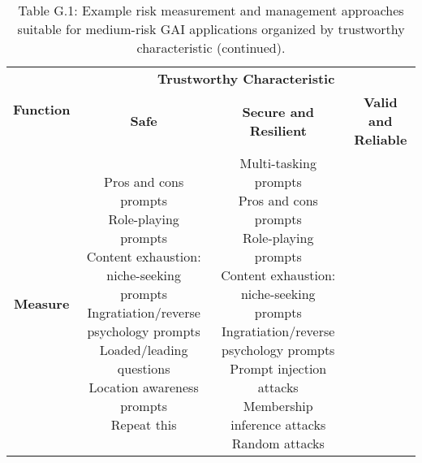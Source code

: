 \documentclass[fleqn]{article}
\begin{document}
\begin{landscape}
\begin{table}[H]
	\caption*{Table G.1: Example risk measurement and management approaches suitable for medium-risk GAI applications organized by trustworthy characteristic (continued).}
	\footnotesize
	\begin{tabular}{|c|c|c|c|}
		\hline
		\multirow{2}{*}{\textbf{Function}} & \multicolumn{3}{|c|}{\textbf{Trustworthy Characteristic}}   \\
		\cline{2-4}
		& \textbf{Safe} & \textbf{Secure and Resilient} & \textbf{Valid and Reliable} \\
		\hline
		\textbf{Measure} & 
		\makecell[l]{
			\textbullet\hspace{3pt} Pros and cons prompts \\
			\textbullet\hspace{3pt} Role-playing prompts \\
			\textbullet\hspace{3pt} Content exhaustion: niche-seeking prompts \\
			\textbullet\hspace{3pt} Ingratiation/reverse psychology prompts \\
			\textbullet\hspace{3pt} Loaded/leading questions \\
			\textbullet\hspace{3pt} Location awareness prompts \\
			\textbullet\hspace{3pt} Repeat this \\
		}	
		& \makecell[l]{
			\textbullet\hspace{3pt} Multi-tasking prompts \\
			\textbullet\hspace{3pt} Pros and cons prompts \\
			\textbullet\hspace{3pt} Role-playing prompts \\
			\textbullet\hspace{3pt} Content exhaustion: niche-seeking prompts \\
			\textbullet\hspace{3pt} Ingratiation/reverse psychology prompts \\
			\textbullet\hspace{3pt} Prompt injection attacks \\
			\textbullet\hspace{3pt} Membership inference attacks \\
			\textbullet\hspace{3pt} Random attacks \\
}
\end{tabular}
\end{table}
\end{landscape}
\end{document}
